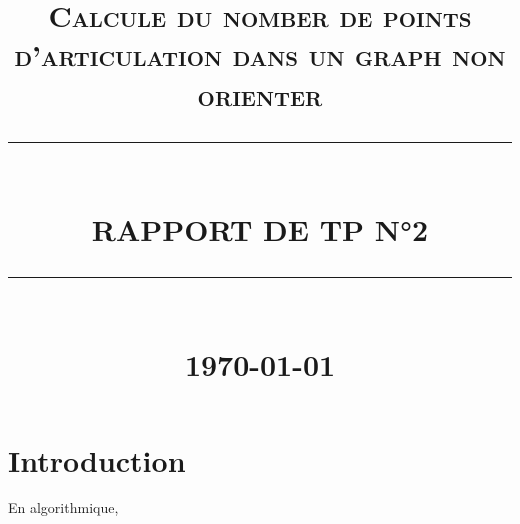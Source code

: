 \documentclass[12pt]{report}
\newcommand{\HRule}[1]{\rule{\linewidth}{#1}}
\begin{document}
	\renewcommand{\contentsname}{Table des Matières}
	\author{}        
	\date{} 
	\title{  \textsc{ Calcule du nomber de points d'articulation dans un graph non orienter}
		\\ [2.0cm]
		\HRule{0.5pt} \\
		\LARGE \textbf{\uppercase{Rapport de TP n°2 }}
		\HRule{2pt} \\ [0.5cm]
		\normalsize \today \vspace*{5\baselineskip}}
	\maketitle
	\tableofcontents
	\renewcommand{\contentsname}
	\newpage
	\sectionfont{\scshape}
	
	\newpage
	\section*{Introduction}
	 \par{}
	 En algorithmique, 
	 
		
		
\end{document}
